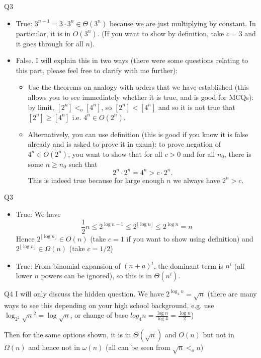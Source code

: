 \documentclass[t]{beamer}
\def\le{\leqslant}
\def\ge{\geqslant}
\begin{document}
\begin{frame}{Q3}
  \begin{itemize}
    \item True: $3^{n+1}=3\cdot3^n \in \Theta(3^n)$ because we are just multiplying by constant. In particular, it is in $O(3^n)$. (If you want to show by definition, take $c=3$ and it goes through for all $n$). 
    \item False. I will explain this in two ways (there were some questions relating to this part, please feel free to clarify with me further): \begin{itemize}
      \item Use the theorems on analogy with orders that we have established (this allows you to see immediately whether it is true, and is good for MCQs): by limit, $[2^n]<_o[4^n]$, so $[2^n] < [4^n]$ and so it is not true that $[2^n] \ge [4^n]$ i.e. $4^n \in O(2^n)$. 
      \item Alternatively, you can use definition (this is good if you know it is false already and is asked to prove it in exam): to prove negation of $4^n \in O(2^n)$, you want to show that for all $c>0$ and for all $n_0$, there is some $n \ge n_0$ such that 
      \[2^n \cdot 2^n = 4^n > c \cdot 2^n.\]
      This is indeed true because for large enough $n$ we always have $2^n >c$. 
    \end{itemize}
  \end{itemize}
\end{frame}
\begin{frame}{Q3}
  \begin{itemize}
    \item True: We have 
    \[\frac{1}{2} n \le 2^{\log{n}-1} \le 2^{\lfloor \log n \rfloor} \le 2^{\log n} = n\]
    Hence $2^{\lfloor \log n \rfloor} \in O(n)$ (take $c=1$ if you want to show using definition) and $2^{\lfloor \log n \rfloor} \in \Omega(n)$ (take $c=1/2$)
    \item True: From binomial expansion of $(n+a)^i$, the dominant term is $n^i$ (all lower $n$ powers can be ignored), so this is in $\Theta(n^i)$. 
  \end{itemize}
\end{frame}
\begin{frame}{Q4}
   I will only discuss the hidden question. We have $2^{\log_4 n} = \sqrt{n}$ (there are many ways to see this depending on your high school background, e.g. use $\log_{2^2}\sqrt{n}^2 = \log {\sqrt{n}}$, or change of base $log_4{n} = \frac{\log{n}}{\log{4}} = \frac{\log n}{2}$) 
    \par Then for the same options shown, it is in $\Theta(\sqrt{n})$ and $O(n)$ but not in $\Omega(n)$ and hence not in $\omega(n)$ (all can be seen from $\sqrt{n} <_o n$)
\end{frame}
\end{document}
